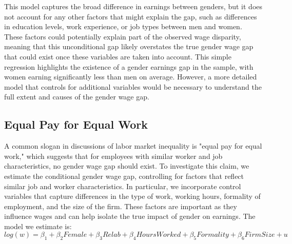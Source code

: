 \documentclass[11pt,a4paper,onecolumn]{article}
\begin{document}
        This model captures the broad difference in earnings between genders, but it does not account for any other factors that might explain the gap, such as differences in education levels, work experience, or job types between men and women. These factors could potentially explain part of the observed wage disparity, meaning that this unconditional gap likely overstates the true gender wage gap that could exist once these variables are taken into account. This simple regression highlights the existence of a gender earnings gap in the sample, with women earning significantly less than men on average. However, a more detailed model that controls for additional variables would be necessary to understand the full extent and causes of the gender wage gap.
            


    \subsection{Equal Pay for Equal Work}
        
        A common slogan in discussions of labor market inequality is "equal pay for equal work," which suggests that for employees with similar worker and job characteristics, no gender wage gap should exist. To investigate this claim, we estimate the conditional gender wage gap, controlling for factors that reflect similar job and worker characteristics. In particular, we incorporate control variables that capture differences in the type of work, working hours, formality of employment, and the size of the firm. These factors are important as they influence wages and can help isolate the true impact of gender on earnings. The model we estimate is:
        \begin{equation}
            log(w) = \beta_1 + \beta_2 {Female} + \beta_3 {Relab} + \beta_4 {Hours Worked} + \beta_5 {Formality} + \beta_6 {FirmSize} + u
        \end{equation}
        
\end{document}
